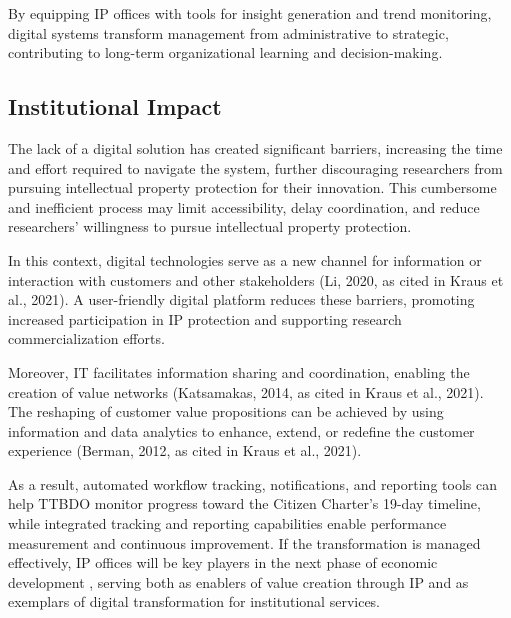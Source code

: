 By equipping IP offices with tools for insight generation and trend monitoring, digital systems transform management from administrative to strategic, contributing to long-term organizational learning and decision-making.

\subsection{Institutional Impact}

The lack of a digital solution has created significant barriers, increasing the time and effort required to navigate the system, further discouraging researchers from pursuing intellectual property protection for their innovation. This cumbersome and inefficient process may limit accessibility, delay coordination, and reduce researchers’ willingness to pursue intellectual property protection.

In this context, digital technologies serve as a new channel for information or interaction with customers and other stakeholders (Li, 2020, as cited in Kraus et al., 2021). A user-friendly digital platform reduces these barriers, promoting increased participation in IP protection and supporting research commercialization efforts.

Moreover, IT facilitates information sharing and coordination, enabling the creation of value networks (Katsamakas, 2014, as cited in Kraus et al., 2021). The reshaping of customer value propositions can be achieved by using information and data analytics to enhance, extend, or redefine the customer experience (Berman, 2012, as cited in Kraus et al., 2021).

As a result, automated workflow tracking, notifications, and reporting tools can help TTBDO monitor progress toward the Citizen Charter's 19-day timeline, while integrated tracking and reporting capabilities enable performance measurement and continuous improvement. If the transformation is managed effectively, IP offices will be key players in the next phase of economic development \citep{wipoIPOBSD}, serving both as enablers of value creation through IP and as exemplars of digital transformation for institutional services.

